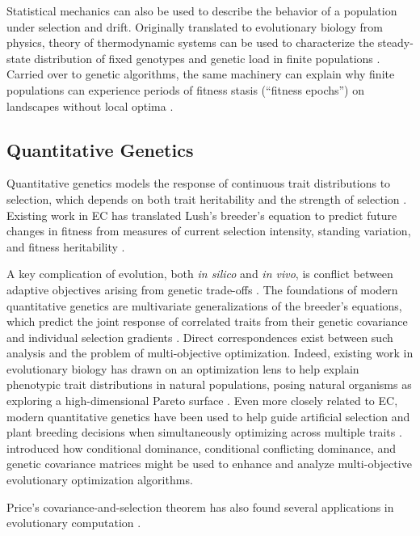 Statistical mechanics can also be used to describe the behavior of a population under selection and drift.
Originally translated to evolutionary biology from physics, theory of thermodynamic systems can be used to characterize the steady-state distribution of fixed genotypes and genetic load in finite populations \citep{sella2005application}.
Carried over to genetic algorithms, the same machinery can explain why finite populations can experience periods of fitness stasis (``fitness epochs'') on landscapes without local optima \citep{vannimwegen1999statistical}.

\subsection{Quantitative Genetics}
\label{sec:quantitative-genetics}

Quantitative genetics models the response of continuous trait distributions to selection, which depends on both trait heritability and the strength of selection \citep{lush1945animal}.
Existing work in EC has translated Lush's breeder's equation to predict future changes in fitness from measures of current selection intensity, standing variation, and fitness heritability \citep{mhlenbein1997equation}. %

A key complication of evolution, both \textit{in silico} and \textit{in vivo}, is conflict between adaptive objectives arising from genetic trade-offs \citep{garland2022trade,deb2002fast}.
The foundations of modern quantitative genetics are multivariate generalizations of the breeder's equations, which predict the joint response of correlated traits from their genetic covariance and individual selection gradients \citep{lande1979quantitative}.
Direct correspondences exist between such analysis and the problem of multi-objective optimization.
Indeed, existing work in evolutionary biology has drawn on an optimization lens to help explain phenotypic trait distributions in natural populations, posing natural organisms as exploring a high-dimensional Pareto surface \citep{shoval2012evolutionary}.
Even more closely related to EC, modern quantitative genetics have been used to help guide artificial selection and plant breeding decisions when simultaneously optimizing across multiple traits \citep{jesusceronrojas2026nonlinear,olivoto2021mgidi}. %
\citet{santana2011quantitative} introduced how conditional dominance, conditional conflicting dominance, and genetic covariance matrices might be used to enhance and analyze multi-objective evolutionary optimization algorithms. %

Price's covariance-and-selection theorem \citep{price1970selection} has also found several applications in evolutionary computation \citep{altenberg1995schema,bassett2004looking,bassett2005applying,potter2003visualizing,altenberg1994evolution,card2008towards,wang2006estimation}.  %
